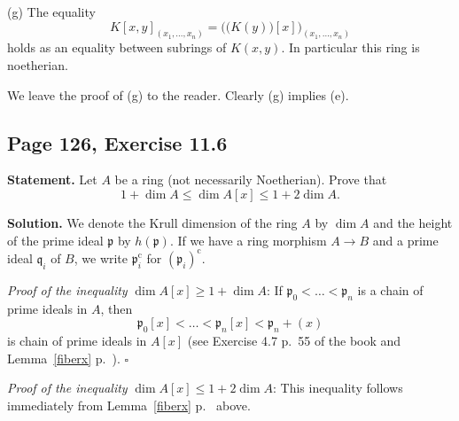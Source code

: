 \documentclass[parskip=half,fontsize=12pt]{scrartcl}%
\newcommand{\oo}{\operatorname}\newcommand{\ooo}{\operatorname*}
\newcommand{\mf}{\mathfrak}
\newcommand{\ppp}{\mf p}
\newcommand{\qqq}{\mf q}
\newcommand{\Spec}{\operatorname{Spec}}\newcommand{\Sp}{\operatorname{Spec}}
\newtheorem{note}[thm]{Note}
\begin{document}
(g) The equality 
$$
K[x,y]_{(x_1,\ldots,x_n)}=\Big(\big(K(y)\big)[x]\Big)_{(x_1,\ldots,x_n)}
$$ 
holds as an equality between subrings of $K(x,y)$. In particular this ring is noetherian. 

We leave the proof of (g) to the reader. Clearly (g) implies (e). 

\subsection{Page 126, Exercise 11.6}\label{116}%

\textbf{Statement.} Let $A$ be a ring (not necessarily Noetherian). Prove that 
$$
1+\dim A\le\dim A[x]\le1+2\dim A.
$$

\textbf{Solution.} We denote the Krull dimension of the ring $A$ by $\dim A$ and the height of the prime ideal $\ppp$ by $h(\ppp)$. If we have a ring morphism $A\to B$ and a prime ideal $\qqq_i$ of $B$, we write $\ppp_i^{\oo c}$ for $(\ppp_i)^{\oo c}$. 




\emph{Proof of the inequality} $\dim A[x]\ge1+\dim A$: If 
$
\ppp_0<\dots<\ppp_n
$ 
is a chain of prime ideals in $A$, then 
$$
\ppp_0[x]<\dots<\ppp_n[x]<\ppp_n+(x)
$$ 
is chain of prime ideals in $A[x]$ (see Exercise 4.7 p.~55 of the book and Lemma~\ref{fiberx} p.~\pageref{fiberx}). $\square$

\emph{Proof of the inequality} $\dim A[x]\le1+2\dim A$: This inequality follows immediately from Lemma~\ref{fiberx} p.~\pageref{fiberx} above.
\end{document}
